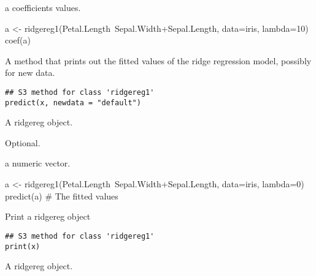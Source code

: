 \documentclass[a4paper]{book}
\begin{document}
%
\begin{Value}
a coefficients values.
\end{Value}
%
\begin{Examples}
\begin{ExampleCode}
a <- ridgereg1(Petal.Length~Sepal.Width+Sepal.Length, data=iris, lambda=10)
coef(a)
\end{ExampleCode}
\end{Examples}
%
\begin{Description}\relax
A method that prints out the fitted values of the ridge regression model, possibly for new data.
\end{Description}
%
\begin{Usage}
\begin{verbatim}
## S3 method for class 'ridgereg1'
predict(x, newdata = "default")
\end{verbatim}
\end{Usage}
%
\begin{Arguments}
\begin{ldescription}
\item[\code{x}] A ridgereg object.

\item[\code{newdata}] Optional.
\end{ldescription}
\end{Arguments}
%
\begin{Value}
a numeric vector.
\end{Value}
%
\begin{Examples}
\begin{ExampleCode}
a <- ridgereg1(Petal.Length~Sepal.Width+Sepal.Length, data=iris, lambda=0)
predict(a) # The fitted values
\end{ExampleCode}
\end{Examples}
%
\begin{Description}\relax
Print a ridgereg object
\end{Description}
%
\begin{Usage}
\begin{verbatim}
## S3 method for class 'ridgereg1'
print(x)
\end{verbatim}
\end{Usage}
%
\begin{Arguments}
\begin{ldescription}
\item[\code{x}] A ridgereg object.
\end{ldescription}
\end{Arguments}
\end{document}
